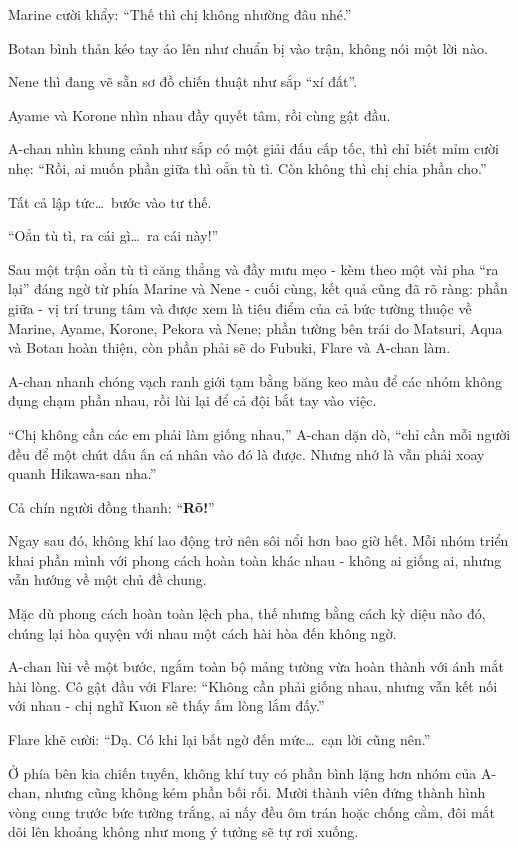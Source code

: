 \documentclass[../main.tex]{subfiles}
\begin{document}
Marine cười khẩy: ``Thế thì chị không nhường đâu nhé.''

Botan bình thản kéo tay áo lên như chuẩn bị vào trận, không nói một lời nào.

Nene thì đang vẽ sẵn sơ đồ chiến thuật như sắp ``xí đất''.

Ayame và Korone nhìn nhau đầy quyết tâm, rồi cùng gật đầu.

A-chan nhìn khung cảnh như sắp có một giải đấu cấp tốc, thì chỉ biết mỉm cười nhẹ: ``Rồi, ai muốn phần giữa thì oẳn tù tì. Còn không thì chị chia phần cho.''

Tất cả lập tức\dots\ bước vào tư thế.

``Oẳn tù tì, ra cái gì\dots\ ra cái này!''

\ct

Sau một trận oẳn tù tì căng thẳng và đầy mưu mẹo - kèm theo một vài pha ``ra lại'' đáng ngờ từ phía Marine và Nene - cuối cùng, kết quả cũng đã rõ ràng: phần giữa - vị trí trung tâm và được xem là tiêu điểm của cả bức tường thuộc về Marine, Ayame, Korone, Pekora và Nene; phần tường bên trái do Matsuri, Aqua và Botan hoàn thiện, còn phần phải sẽ do Fubuki, Flare và A-chan làm.

A-chan nhanh chóng vạch ranh giới tạm bằng băng keo màu để các nhóm không đụng chạm phần nhau, rồi lùi lại để cả đội bắt tay vào việc.

``Chị không cần các em phải làm giống nhau,'' A-chan dặn dò, ``chỉ cần mỗi người đều để một chút dấu ấn cá nhân vào đó là được. Nhưng nhớ là vẫn phải xoay quanh Hikawa-san nha.''

Cả chín người đồng thanh: ``\textbf{Rõ!}''

Ngay sau đó, không khí lao động trở nên sôi nổi hơn bao giờ hết. Mỗi nhóm triển khai phần mình với phong cách hoàn toàn khác nhau - không ai giống ai, nhưng vẫn hướng về một chủ đề chung.

Mặc dù phong cách hoàn toàn lệch pha, thế nhưng bằng cách kỳ diệu nào đó, chúng lại hòa quyện với nhau một cách hài hòa đến không ngờ.

A-chan lùi về một bước, ngắm toàn bộ mảng tường vừa hoàn thành với ánh mắt hài lòng. Cô gật đầu với Flare: ``Không cần phải giống nhau, nhưng vẫn kết nối với nhau - chị nghĩ Kuon sẽ thấy ấm lòng lắm đấy.''

Flare khẽ cười: ``Dạ. Có khi lại bất ngờ đến mức\dots\ cạn lời cũng nên.''

\ct

Ở phía bên kia chiến tuyến, không khí tuy có phần bình lặng hơn nhóm của A-chan, nhưng cũng không kém phần bối rối. Mười thành viên đứng thành hình vòng cung trước bức tường trắng, ai nấy đều ôm trán hoặc chống cằm, đôi mắt dõi lên khoảng không như mong ý tưởng sẽ tự rơi xuống.
\end{document}
